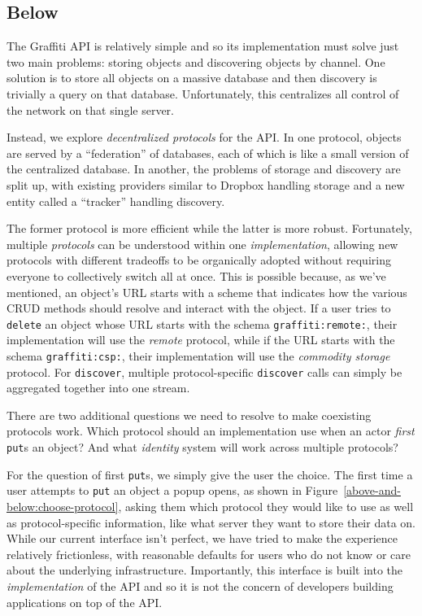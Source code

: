 \subsection{Below}

The Graffiti API is relatively simple
and so its implementation must solve just two main problems:
storing objects and discovering objects by channel.
One solution is to store all objects on a massive database
and then discovery is trivially a query on that database.
Unfortunately, this centralizes all control of the network
on that single server.

Instead, we explore \emph{decentralized protocols} for the API.
In one protocol, objects are served by a ``federation'' of databases,
each of which is like a small version of the centralized database.
In another, the problems of storage and discovery are split up,
with existing providers similar to Dropbox handling storage
and a new entity called a ``tracker'' handling discovery.

The former protocol is more efficient while the latter is more robust.
Fortunately, multiple \emph{protocols} can be understood within one \emph{implementation},
allowing new protocols
with different tradeoffs to be organically adopted without requiring
everyone to collectively switch all at once.
This is possible because, as we've mentioned, an object's URL starts with a scheme that indicates
how the various CRUD methods should resolve and interact with the object.
If a user tries to \texttt{delete} an object whose URL starts with the schema
\texttt{graffiti:remote:}, their implementation will use the \emph{remote}
protocol, while if the URL starts with the schema \texttt{graffiti:csp:},
their implementation will use the \emph{commodity storage} protocol.
For \texttt{discover}, multiple protocol-specific \texttt{discover}
calls can simply be aggregated together into one stream.

There are two additional questions we need to resolve to
make coexisting protocols work.
Which protocol should an implementation use
when an actor \emph{first} \texttt{put}s an object?
And what \emph{identity} system will work across multiple
protocols?

For the question of first \texttt{put}s, we simply give the user the choice.
The first time a user attempts to \texttt{put} an object
a popup opens,
as shown in Figure~\ref{above-and-below:choose-protocol},
asking them which protocol they would like to use
as well as protocol-specific information, like what server
they want to store their data on.
While our current interface isn't perfect,
we have tried to make the experience relatively frictionless, with
reasonable defaults for
users who do not know or care about the underlying infrastructure.
Importantly, this interface is built into the \emph{implementation}
of the API and so it is not the concern of developers building
applications on top of the API.

